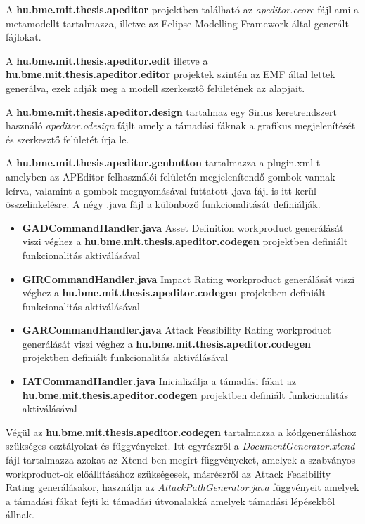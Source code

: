 A \textbf{hu.bme.mit.thesis.apeditor} projektben található az \textit{apeditor.ecore} fájl ami a metamodellt tartalmazza, illetve az Eclipse Modelling Framework által generált fájlokat.

A \textbf{hu.bme.mit.thesis.apeditor.edit} illetve a \textbf{hu.bme.mit.thesis.apeditor.editor} projektek szintén az EMF által lettek generálva, ezek adják meg a modell szerkesztő felületének az alapjait.

A \textbf{hu.bme.mit.thesis.apeditor.design} tartalmaz egy Sirius keretrendszert használó \textit{apeditor.odesign} fájlt amely a támadási fáknak a grafikus megjelenítését és szerkesztő felületét írja le.

A \textbf{hu.bme.mit.thesis.apeditor.genbutton} tartalmazza a plugin.xml-t amelyben az APEditor felhasználói felületén megjelenítendő gombok vannak leírva, valamint a gombok megnyomásával futtatott .java fájl is itt kerül összelinkelésre. A négy .java fájl a különböző funkcionalitását definiálják.

\begin{itemize}
	\item \textbf{GADCommandHandler.java} Asset Definition workproduct generálását viszi véghez a \textbf{hu.bme.mit.thesis.apeditor.codegen} projektben definiált funkcionalitás aktiválásával
	\item \textbf{GIRCommandHandler.java} Impact Rating workproduct generálását viszi véghez a \textbf{hu.bme.mit.thesis.apeditor.codegen} projektben definiált funkcionalitás aktiválásával
	\item \textbf{GARCommandHandler.java} Attack Feasibility Rating workproduct generálását viszi véghez a \textbf{hu.bme.mit.thesis.apeditor.codegen} projektben definiált funkcionalitás aktiválásával
	\item \textbf{IATCommandHandler.java} Inicializálja a támadási fákat az \textbf{hu.bme.mit.thesis.apeditor.codegen} projektben definiált funkcionalitás aktiválásával
\end{itemize} 

Végül az \textbf{hu.bme.mit.thesis.apeditor.codegen} tartalmazza a kódgeneráláshoz szükséges osztályokat és függvényeket. Itt egyrészről a \textit{DocumentGenerator.xtend} fájl tartalmazza azokat az Xtend-ben megírt függvényeket, amelyek a szabványos workproduct-ok előállításához szükségesek, másrészről az Attack Feasibility Rating generálásakor, használja az \textit{AttackPathGenerator.java} függvényeit amelyek a támadási fákat fejti ki támadási útvonalakká amelyek támadási lépésekből állnak.


